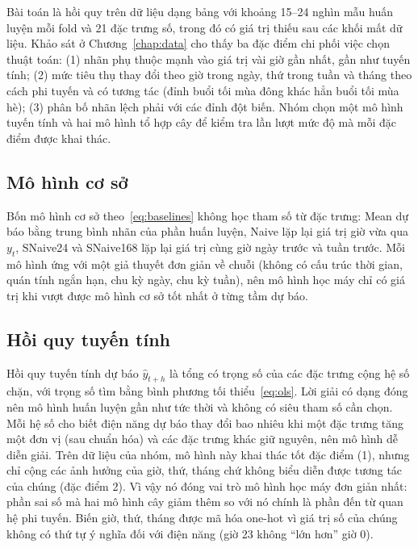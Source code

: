 Bài toán là hồi quy trên dữ liệu dạng bảng với khoảng 15--24 nghìn mẫu huấn luyện mỗi fold và 21 đặc trưng số, trong đó có giá trị thiếu sau các khối mất dữ liệu. Khảo sát ở Chương~\ref{chap:data} cho thấy ba đặc điểm chi phối việc chọn thuật toán: (1) nhãn phụ thuộc mạnh vào giá trị vài giờ gần nhất, gần như tuyến tính; (2) mức tiêu thụ thay đổi theo giờ trong ngày, thứ trong tuần và tháng theo cách phi tuyến và có tương tác (đỉnh buổi tối mùa đông khác hẳn buổi tối mùa hè); (3) phân bố nhãn lệch phải với các đỉnh đột biến. Nhóm chọn một mô hình tuyến tính và hai mô hình tổ hợp cây để kiểm tra lần lượt mức độ mà mỗi đặc điểm được khai thác.

\subsection{Mô hình cơ sở}
Bốn mô hình cơ sở theo~\eqref{eq:baselines} không học tham số từ đặc trưng: Mean dự báo bằng trung bình nhãn của phần huấn luyện, Naive lặp lại giá trị giờ vừa qua $y_t$, SNaive24 và SNaive168 lặp lại giá trị cùng giờ ngày trước và tuần trước. Mỗi mô hình ứng với một giả thuyết đơn giản về chuỗi (không có cấu trúc thời gian, quán tính ngắn hạn, chu kỳ ngày, chu kỳ tuần), nên mô hình học máy chỉ có giá trị khi vượt được mô hình cơ sở tốt nhất ở từng tầm dự báo.

\subsection{Hồi quy tuyến tính}
Hồi quy tuyến tính dự báo $\hat{y}_{t+h}$ là tổng có trọng số của các đặc trưng cộng hệ số chặn, với trọng số tìm bằng bình phương tối thiểu~\eqref{eq:ols}. Lời giải có dạng đóng nên mô hình huấn luyện gần như tức thời và không có siêu tham số cần chọn. Mỗi hệ số cho biết điện năng dự báo thay đổi bao nhiêu khi một đặc trưng tăng một đơn vị (sau chuẩn hóa) và các đặc trưng khác giữ nguyên, nên mô hình dễ diễn giải. Trên dữ liệu của nhóm, mô hình này khai thác tốt đặc điểm (1), nhưng chỉ cộng các ảnh hưởng của giờ, thứ, tháng chứ không biểu diễn được tương tác của chúng (đặc điểm 2). Vì vậy nó đóng vai trò mô hình học máy đơn giản nhất: phần sai số mà hai mô hình cây giảm thêm so với nó chính là phần đến từ quan hệ phi tuyến. Biến giờ, thứ, tháng được mã hóa one-hot vì giá trị số của chúng không có thứ tự ý nghĩa đối với điện năng (giờ 23 không ``lớn hơn'' giờ 0).

